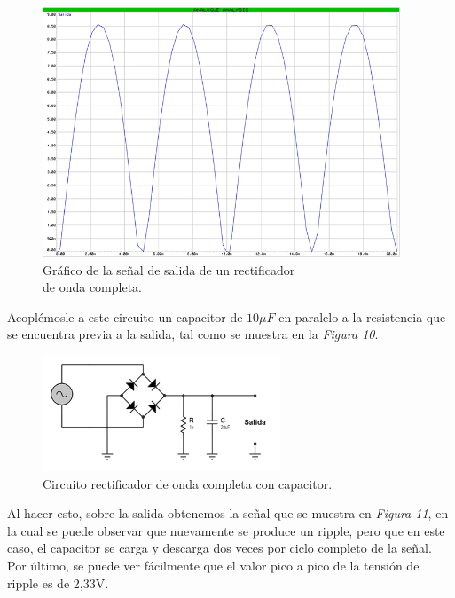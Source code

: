 \documentclass{article}
\begin{document}
\begin{figure}[h]
	\centering
	\includegraphics[width=0.95\textwidth]{images/4-4-6-grafico-circuito-rectificador-onda-completa.jpg}
	\medskip
	\caption{Gráfico de la señal de salida de un rectificador\\ de onda completa.}
\end{figure}
\bigskip\bigskip


	Acoplémosle a este circuito un capacitor de $10\mu F$ en paralelo a la resistencia que se encuentra previa a la salida, tal como se muestra en la \textit{Figura 10}.
\bigskip


\begin{figure}[h]
	\centering
	\includegraphics[width=0.633\textwidth]{images/4-4-7-circuito-rectificador-onda-completa-con-filtro.jpg}
	\medskip
	\caption{Circuito rectificador de onda completa con capacitor.}
\end{figure}
\bigskip\bigskip


	Al hacer esto, sobre la salida obtenemos la señal que se muestra en \textit{Figura 11}, en la cual se puede observar que nuevamente se produce un ripple, pero que en este caso, el capacitor se carga y descarga dos veces por ciclo completo de la señal. Por último, se puede ver fácilmente que el valor pico a pico de la tensión de ripple es de 2,33V.
\bigskip\bigskip
\end{document}
